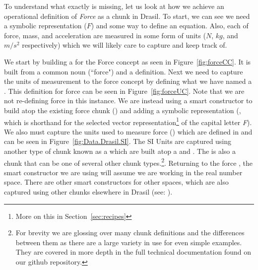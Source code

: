 To understand what exactly is missing, let us look at how we achieve an 
operational definition of \emph{Force} as a chunk in Drasil. To start, we can 
see we need a symbolic representation ($F$) and some way to define an equation. 
Also, each of force, mass, and acceleration are measured in some form of units 
($N$, $kg$, and $m/s^2$ respectively) which we will likely care to capture and 
keep track of. 



We start by building a  for the Force concept as seen in 
Figure~\ref{fig:forceCC}. It is built from a common noun (``force") and a 
definition. Next we need to capture the units of measurement to the force 
concept by defining what we have named a . This definition 
for force can be seen in Figure~\ref{fig:forceUC}. Note that we are not 
re-defining force in this instance. We are instead using a smart constructor to 
build atop the existing force chunk () and adding a symbolic 
representation (, which is shorthand for the selected vector 
representation\footnote{More on this in Section~\ref{sec:recipes}} of the 
capital letter \emph{F}). We also must capture the units used to measure force
() which are defined in  and can be 
seen in Figure~\ref{fig:Data.Drasil.SI}. The SI Units are captured using 
another type of chunk known as a  which are built atop a 
 and . The  is also a 
chunk that can be one of several other chunk types.\footnote{For brevity we are 
glossing over many chunk definitions and the differences between them as there 
are a large variety in use for even simple examples. They are covered in more 
depth in the full technical documentation found on our github repository.}. 
Returning to the force , the smart constructor  we 
are using will assume we are working in the real number space. There are 
other smart constructors for other spaces, which are also captured using other 
chunks elsewhere in Drasil (see: ).


